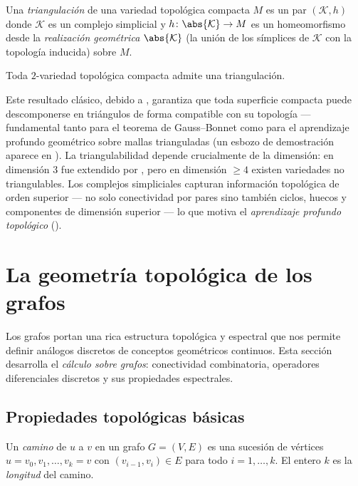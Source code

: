 \begin{definition}[Triangulaci\'on]
\label{def:graphs:triangulation}
Una \emph{triangulaci\'on} de una variedad topol\'ogica compacta $M$ es un par
$(\mathcal{K}, h)$ donde $\mathcal{K}$ es un complejo simplicial y
$h \colon \abs{\mathcal{K}} \to M$ es un homeomorfismo desde la
\emph{realizaci\'on geom\'etrica} $\abs{\mathcal{K}}$ (la uni\'on de los
s\'implices de $\mathcal{K}$ con la topolog\'ia inducida) sobre $M$.
\end{definition}

\begin{theorem}[Rad\'o]
\label{thm:graphs:rado}
Toda $2$-variedad topol\'ogica compacta admite una triangulaci\'on.
\end{theorem}

Este resultado cl\'asico, debido a \citet{rado1925aufgabe}, garantiza que toda
superficie compacta puede descomponerse en tri\'angulos de forma compatible con
su topolog\'ia --- fundamental tanto para el teorema de Gauss--Bonnet como para
el aprendizaje profundo geom\'etrico sobre mallas trianguladas (un esbozo de
demostraci\'on aparece en ). La triangulabilidad depende
crucialmente de la dimensi\'on: en dimensi\'on $3$ fue extendido por
\citet{moise1977geometric}, pero en dimensi\'on $\ge 4$ existen variedades no
triangulables. Los complejos simpliciales capturan informaci\'on topol\'ogica de
orden superior --- no solo conectividad por pares sino tambi\'en ciclos, huecos y
componentes de dimensi\'on superior --- lo que motiva el \emph{aprendizaje
profundo topol\'ogico} ().

\section{La geometr\'ia topol\'ogica de los grafos}
\label{sec:graphs:topology}

Los grafos portan una rica estructura topol\'ogica y espectral que nos permite
definir an\'alogos discretos de conceptos geom\'etricos continuos. Esta secci\'on
desarrolla el \emph{c\'alculo sobre grafos}: conectividad combinatoria, operadores
diferenciales discretos y sus propiedades espectrales.

\subsection{Propiedades topol\'ogicas b\'asicas}
\label{sec:graphs:basic-topology}

\begin{definition}
\label{def:graphs:path}
Un \emph{camino} de $u$ a $v$ en un grafo $G = (V, E)$ es una sucesi\'on de
v\'ertices $u = v_0, v_1, \dots, v_k = v$ con $(v_{i-1}, v_i) \in E$ para todo
$i = 1, \dots, k$. El entero $k$ es la \emph{longitud} del camino.
\end{definition}

